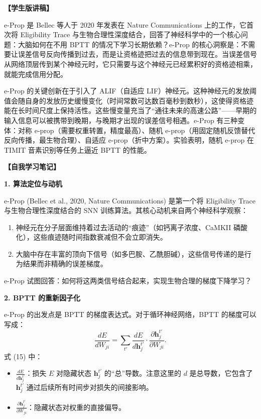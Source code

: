 \documentclass[journal,12pt,onecolumn]{IEEEtran}
\begin{document}
\textbf{【学生版讲稿】}

e-Prop 是 Bellec 等人于 2020 年发表在 Nature Communications 上的工作，它首次将 Eligibility Trace 与生物合理性深度结合，回答了神经科学中的一个核心问题：大脑如何在不用 BPTT 的情况下学习长期依赖？e-Prop 的核心洞察是：不需要让误差信号反向传播到过去，而是让资格迹把过去的信息带到现在。当误差信号从网络顶层传到某个神经元时，它只需要与这个神经元已经累积好的资格迹相乘，就能完成信用分配。

e-Prop 的关键创新在于引入了 ALIF（自适应 LIF）神经元。这种神经元的发放阈值会随自身的发放历史缓慢变化（时间常数可达数百毫秒到数秒），这使得资格迹能在长时间尺度上保持活性。这些慢变量充当了“通往未来的高速公路”——早期的输入信息可以被携带到晚期，与晚期才出现的误差信号相遇。e-Prop 有三种变体：对称 e-prop（需要权重转置，精度最高）、随机 e-prop（用固定随机反馈替代反向传播，最生物合理）、自适应 e-prop（折中方案）。实验表明，随机 e-prop 在 TIMIT 音素识别等任务上逼近 BPTT 的性能。

\bigskip\noindent\textbf{【自我学习笔记】}

\medskip\noindent\textbf{1. 算法定位与动机}

e-Prop (Bellec et al., 2020, Nature Communications) 是第一个将 Eligibility Trace 与生物合理性深度结合的 SNN 训练算法。其核心动机来自两个神经科学观察：
\begin{enumerate}
    \item 神经元在分子层面维持着过去活动的“痕迹”（如钙离子浓度、CaMKII 磷酸化），这些痕迹随时间指数衰减但不会立即消失。
    \item 大脑中存在丰富的顶向下信号（如多巴胺、乙酰胆碱），这些信号传递的是行为结果而非精确的误差梯度。
\end{enumerate}
e-Prop 试图回答：如何将这两类信号结合起来，实现生物合理的梯度下降学习？

\medskip\noindent\textbf{2. BPTT 的重新因子化}

e-Prop 的出发点是 BPTT 的梯度表达式。对于循环神经网络，BPTT 的梯度可以写成：
\[
\frac{dE}{dW_{ji}} = \sum_{t'} \frac{dE}{d\mathbf{h}_j^{t'}} \cdot \frac{\partial \mathbf{h}_j^{t'}}{\partial W_{ji}}. \tag{15}
\]
式 (15) 中：
\begin{itemize}
    \item $\frac{dE}{d\mathbf{h}_j^{t'}}$：损失 $E$ 对隐藏状态 $\mathbf{h}_j^{t'}$ 的“总”导数。注意这里的 $d$ 是总导数，它包含了 $\mathbf{h}_j^{t'}$ 通过后续所有时间步对损失的间接影响。
    \item $\frac{\partial \mathbf{h}_j^{t'}}{\partial W_{ji}}$：隐藏状态对权重的直接偏导。
\end{itemize}
\end{document}

